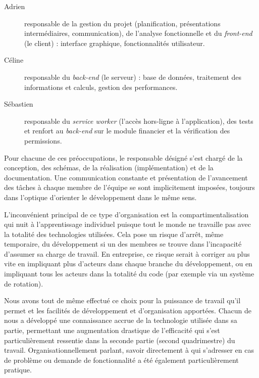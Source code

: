\documentclass{EPL-master-thesis-covers-FR}
\begin{document}
				\begin{description}
					\item[Adrien] responsable de la gestion du projet (planification, présentations intermédiaires, communication), de l'analyse fonctionnelle et du \emph{front-end} (le client) : interface graphique, fonctionnalités utilisateur.

					\item[Céline] responsable du \emph{back-end} (le serveur) : base de données, traitement des informations et calculs, gestion des performances.

					\item[Sébastien] responsable du \emph{service worker} (l'accès hors-ligne à l'application), des tests et renfort au \emph{back-end} sur le module financier et la vérification des permissions.
				\end{description}

				Pour chacune de ces préoccupations, le responsable désigné s'est chargé de la conception, des schémas, de la réalisation (implémentation) et de la documentation. Une communication constante et présentation de l'avancement des tâches à chaque membre de l'équipe se sont implicitement imposées, toujours dans l'optique d'orienter le développement dans le même sens.

				L'inconvénient principal de ce type d'organisation est la compartimentalisation qui nuit à l'apprentissage individuel puisque tout le monde ne travaille pas avec la totalité des technologies utilisées. Cela pose un risque d'arrêt, même temporaire, du développement si un des membres se trouve dans l'incapacité d'assumer sa charge de travail. En entreprise, ce risque serait à corriger au plus vite en impliquant plus d'acteurs dans chaque branche du développement, ou en impliquant tous les acteurs dans la totalité du code (par exemple via un système de rotation).

				Nous avons tout de même effectué ce choix pour la puissance de travail qu'il permet et les facilités de développement et d'organisation apportées. Chacun de nous a développé une connaissance accrue de la technologie utilisée dans sa partie, permettant une augmentation drastique de l'efficacité qui s'est particulièrement ressentie dans la seconde partie (second quadrimestre) du travail. Organisationnellement parlant, savoir directement à qui s'adresser en cas de problème ou demande de fonctionnalité a été également particulièrement pratique.
\end{document}
